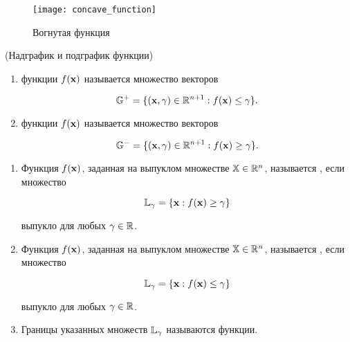 \begin{figure} \centering
   \texttt{[image: concave\_function]}\\
  \caption{Вогнутая функция}\label{fig:concave-function}
\end{figure}


\begin{dfn} (Надграфик и подграфик функции)
\begin{enumerate}
\renewcommand{\theenumi}{(\asbuk{enumi})}

\item {} функции $f(\mathbf{x})$ называется множество
векторов

\[
\mathbb{G}^+=\{ (\mathbf{x}, \gamma) \in \mathbb{R}^{n+1}: f(\mathbf{x}) \leq \gamma \}.
\]

\item {} функции $f(\mathbf{x})$ называется множество
векторов

\[
\mathbb{G}^- =\{ (\mathbf{x}, \gamma) \in \mathbb{R}^{n+1}: f(\mathbf{x}) \geq \gamma
\}.
\]

\end{enumerate}
\end{dfn}


\begin{dfn}
\begin{enumerate}
\renewcommand{\theenumi}{(\asbuk{enumi})}

\item Функция $f(\mathbf{x})$, заданная на выпуклом множестве $\mathbb{X} \in
  \mathbb{R}^n$, называется ,
  если множество

\[ \mathbb{L}_{\gamma}=\{ \mathbf{x}: f(\mathbf{x}) \geq \gamma
  \}\]

  \noindent выпукло для любых $\gamma \in \mathbb{R}$.

\item Функция $f(\mathbf{x})$, заданная на выпуклом множестве $\mathbb{X} \in
  \mathbb{R}^n$, называется ,
  если множество

\[ \mathbb{L}_{\gamma}= \{ \mathbf{x}: f(\mathbf{x}) \leq \gamma \}\]

\noindent выпукло для любых $\gamma \in \mathbb{R}$.

\item Границы указанных множеств $\mathbb{L}_{\gamma}$ называются 
  функции.

\end{enumerate}
\end{dfn}

